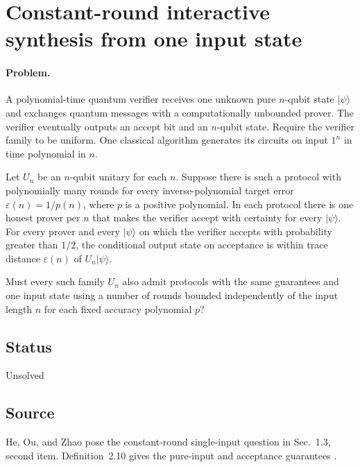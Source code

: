 \section{Constant-round interactive synthesis from one input state}
\label{sec:op_56a94cef9e09d45c}

\paragraph{Problem.}
A polynomial-time quantum verifier receives one unknown pure $n$-qubit state $\lvert\psi\rangle$ and exchanges quantum messages with a computationally unbounded prover. The verifier eventually outputs an accept bit and an $n$-qubit state. Require the verifier family to be uniform. One classical algorithm generates its circuits on input $1^n$ in time polynomial in $n$.

Let $U_n$ be an $n$-qubit unitary for each $n$. Suppose there is such a protocol with polynomially many rounds for every inverse-polynomial target error $\varepsilon(n)=1/p(n)$, where $p$ is a positive polynomial. In each protocol there is one honest prover per $n$ that makes the verifier accept with certainty for every $\lvert\psi\rangle$. For every prover and every $\lvert\psi\rangle$ on which the verifier accepts with probability greater than $1/2$, the conditional output state on acceptance is within trace distance $\varepsilon(n)$ of $U_n\lvert\psi\rangle$.

Must every such family $U_n$ also admit protocols with the same guarantees and one input state using a number of rounds bounded independently of the input length $n$ for each fixed accuracy polynomial $p$?

\subsection*{Status}

Unsolved

\subsection*{Source}

He, Ou, and Zhao pose the constant-round single-input question in Sec.~1.3, second item. Definition~2.10 gives the pure-input and acceptance guarantees .

